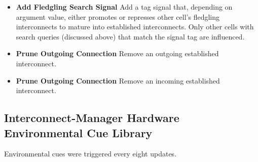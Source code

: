 \begin{itemize}
\item \textbf{Add Fledgling Search Signal}
Add a tag signal that, depending on argument value, either promotes or represses other cell's fledgling interconnects to mature into established interconnects.
Only other cells with search queries (discussed above) that match the signal tag are influenced.
\item \textbf{Prune Outgoing Connection}
Remove an outgoing established interconnect.
\item \textbf{Prune Outgoing Connection}
Remove an incoming established interconnect.
\end{itemize}

\subsection{Interconnect-Manager Hardware Environmental Cue Library}

Environmental cues were triggered every eight updates.

